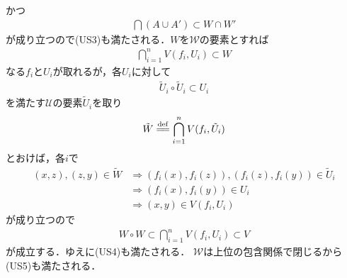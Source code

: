 \begin{sketch}
\begin{description}
				かつ
				\begin{align}
					\bigcap (A \cup A') \subset W \cap W'
				\end{align}
				が成り立つので(US3)も満たされる．$W$を$\mathscr{W}$の要素とすれば
				\begin{align}
					\bigcap_{i=1}^n V(f_i,U_i) \subset W
				\end{align}
				なる$f_i$と$U_i$が取れるが，各$U_i$に対して
				\begin{align}
					\tilde{U}_i \circ \tilde{U}_i \subset U_i
				\end{align}
				を満たす$\mathscr{U}$の要素$\tilde{U}_i$を取り
				\begin{align}
					\tilde{W} \defeq \bigcap_{i=1}^n V(f_i,\tilde{U}_i)
				\end{align}
				とおけば，各$i$で
				\begin{align}
					(x,z),(z,y) \in \tilde{W} 
					&\Longrightarrow (f_i(x),f_i(z)),(f_i(z),f_i(y)) \in \tilde{U}_i \\
					&\Longrightarrow (f_i(x),f_i(y)) \in U_i \\
					&\Longrightarrow (x,y) \in V(f_i,U_i)
				\end{align}
				が成り立つので
				\begin{align}
					W \circ W \subset \bigcap_{i=1}^n V(f_i,U_i) \subset V
				\end{align}
				が成立する．ゆえに(US4)も満たされる．
				$\mathscr{W}$は上位の包含関係で閉じるから(US5)も満たされる．
				

\end{description}
\end{sketch}
